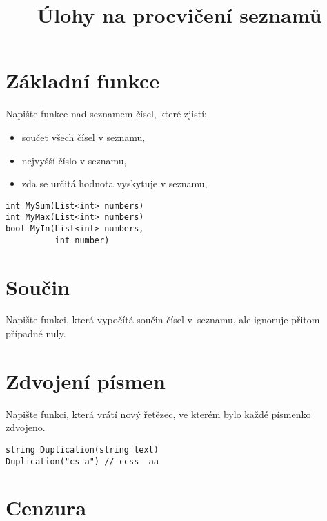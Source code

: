 \documentclass[12pt,a4paper]{article}
\begin{document}
\pagestyle{empty}
\title{Úlohy na procvičení seznamů}
\date{\vspace{-10ex}}
\setlength{\droptitle}{-6em}
\maketitle

\setlength\parindent{0pt}

\begin{multicols}{2}

\section{Základní funkce}

Napište funkce nad seznamem čísel, které zjistí:

\begin{itemize}[noitemsep,nolistsep]
	\item součet všech čísel v seznamu,
	\item nejvyšší číslo v seznamu,
	\item zda se určitá hodnota vyskytuje v seznamu,
\end{itemize}

\begin{verbatim}
int MySum(List<int> numbers)
int MyMax(List<int> numbers)
bool MyIn(List<int> numbers,
          int number)
\end{verbatim}

\section{Součin}

Napište funkci, která vypočítá součin čísel v~seznamu, ale ignoruje přitom
případné nuly.

\section{Zdvojení písmen}

Napište funkci, která vrátí nový řetězec, ve kterém bylo každé písmenko
zdvojeno.

\begin{verbatim}
string Duplication(string text)
Duplication("cs a") // ccss  aa
\end{verbatim}

\section{Cenzura}


\end{multicols}
\end{document}
